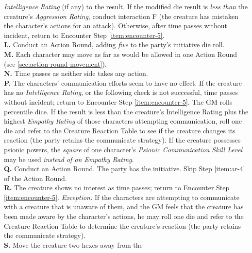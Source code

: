 \begin{table}[htbp]
{\begin{minipage}{0.95\textwidth}
\begin{minipage}{0.95\textwidth}
\begin{multicols}{2}
          \emph{Intelligence Rating} (if any) to the result. If the
          modified die result is \emph{less than} the creature's
          \emph{Aggression Rating}, conduct interaction F (the creature
          has mistaken the character's actions for an attack).
          Otherwise, after time
          passes without incident, return to Encounter Step
          \ref{item:encounter-5}.\\ 
          \textbf{L.} Conduct an Action Round, adding \emph{five} to the
          party's
          initiative die roll.\\
          \textbf{M.} Each character may move as far as would be allowed
          in
          one Action Round (see \ref{sec:action-round-movement}).\\
          \textbf{N.} Time passes as neither side takes any action.\\
          \textbf{P.} The characters' communication efforts seem to have
          no effect. If the creature has no \emph{Intelligence Rating},
          or the following check is not successful, time passes without
          incident; return to Encounter Step \ref{item:encounter-5}. The
          GM rolls percentile dice. If the result is less than the
          creature's Intelligence Rating plus the highest \emph{Empathy
            Rating} of those characters attempting communication, roll
          one die and refer to the Creature Reaction Table to see if the
          creature changes its reaction (the party retains the
          communicate strategy). If the creature possesses psionic
          powers, the \emph{square} of one character's \emph{Psionic
            Communication Skill Level} may be used
          \emph{instead of an Empathy Rating}.\\
          \textbf{Q.} Conduct an Action Round. The party has the
          initiative.
          Skip Step \ref{item:ar-4} of the Action Round.\\
          \textbf{R.} The creature shows no interest as time passes;
          return to Encounter Step \ref{item:encounter-5}.
          \emph{Exception:} If the characters are attempting to
          communicate with a creature that is unaware of them, and the
          GM feels that the creature has been made aware by the
          character's actions, he may roll one die and refer to the
          Creature Reaction Table to determine the creature's
          reaction (the party retains the communicate strategy).\\
          \textbf{S.} Move the creature two hexes away from the

\end{multicols}
\end{minipage}
\end{minipage}}
\end{table}
